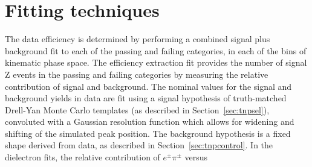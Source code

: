 \section{Fitting techniques}
\label{sec:tnpfits}
The data efficiency is determined by performing a combined signal plus background fit to each of the
passing and failing categories, in each of the bins of kinematic phase space. 
The efficiency extraction fit provides the number of signal Z events in the passing and failing categories 
by measuring the relative contribution of signal and background.
The nominal values for the signal and background yields in data are fit using a signal hypothesis
of truth-matched Drell-Yan Monte Carlo templates (as described in Section~\ref{sec:tnpsel}),
convoluted with a Gaussian resolution function which allows for widening and shifting of the
simulated peak position. The background hypothesis is a fixed shape derived from data, as
described in Section~\ref{sec:tnpcontrol}.
In the dielectron fits, the relative contribution of \ensuremath{e^{\pm}\pi^{\pm}} versus 
